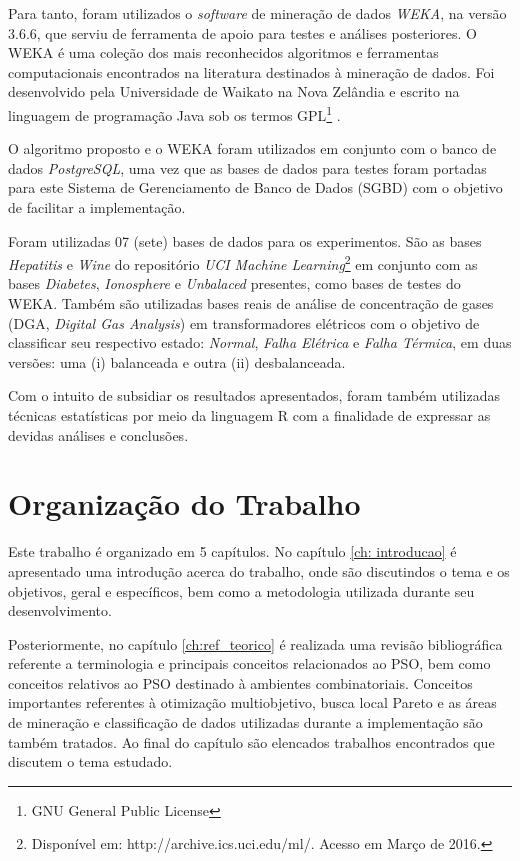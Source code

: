 \documentclass[
	12pt,				%
	openany,			%
	oneside,	
	a4paper,			%
	brazil,				%
	]{unimontes-ppgmsc-abntex2}
\begin{document}
Para tanto, foram utilizados o \textit{software} de mineração de dados {\em WEKA}, na versão 3.6.6, que serviu de ferramenta de apoio para testes e análises posteriores. O WEKA é uma coleção dos mais reconhecidos algoritmos e ferramentas computacionais encontrados na literatura destinados à mineração de dados. Foi desenvolvido pela Universidade de Waikato na Nova Zelândia e escrito na linguagem de programação Java sob os termos GPL\footnote{GNU General Public License} \cite{Witten_2005}.

O algoritmo proposto e o WEKA foram utilizados em conjunto com o banco de dados {\em PostgreSQL}, uma vez que as bases de dados para testes foram portadas para este Sistema de Gerenciamento de Banco de Dados (SGBD) com o objetivo de facilitar a implementação. 

Foram utilizadas 07 (sete) bases de dados para os experimentos. São as bases {\em Hepatitis} e {\em Wine} do repositório {\em UCI Machine Learning}\footnote{Disponível em: http://archive.ics.uci.edu/ml/. Acesso em Março de 2016.} em conjunto com as bases {\em Diabetes}, {\em Ionosphere} e {\em Unbalaced} presentes, como bases de testes do WEKA. Também são utilizadas bases reais de análise de concentração de gases (DGA, {\em Digital Gas Analysis}) em transformadores elétricos com o objetivo de classificar seu respectivo estado: {\em Normal}, {\em Falha Elétrica} e {\em Falha Térmica}, em duas versões: uma (i) balanceada e outra (ii) desbalanceada.

Com o intuito de subsidiar os resultados apresentados, foram também utilizadas técnicas estatísticas por meio da linguagem R com a finalidade de expressar as devidas análises e conclusões.

\section{Organização do Trabalho}

Este trabalho é organizado em 5 capítulos. No capítulo \ref{ch: introducao} é apresentado uma introdução acerca do trabalho, onde são discutindos o tema e os objetivos, geral e específicos, bem como a metodologia utilizada durante seu desenvolvimento. 

Posteriormente, no capítulo \ref{ch:ref_teorico} é realizada uma revisão bibliográfica referente a terminologia e principais conceitos relacionados ao PSO, bem como conceitos relativos ao PSO destinado à ambientes combinatoriais. Conceitos importantes referentes à otimização multiobjetivo, busca local Pareto e as áreas de mineração e classificação de dados utilizadas durante a implementação são também tratados. Ao final do capítulo são elencados trabalhos encontrados que discutem o tema estudado.
\end{document}
